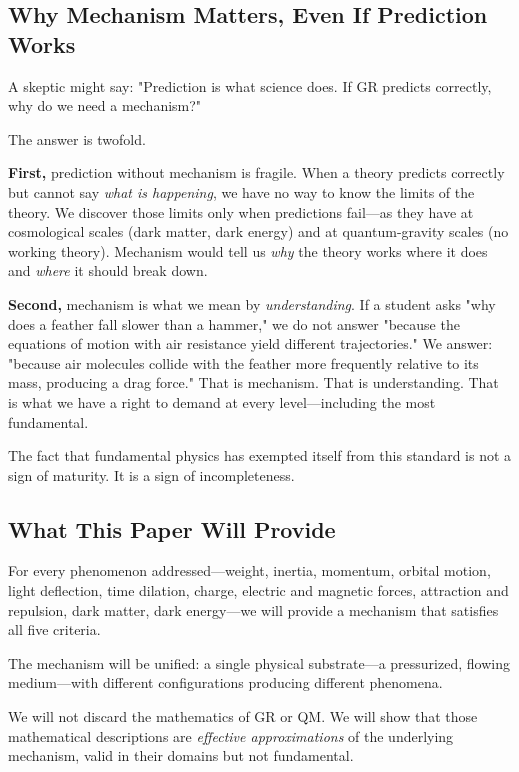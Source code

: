 \documentclass[12pt, a4paper]{article}
\begin{document}
\subsection{Why Mechanism Matters, Even If Prediction Works}
\label{subsec:why_mechanism_matters}

A skeptic might say: "Prediction is what science does. If GR predicts correctly, why do we need a mechanism?"

The answer is twofold.

\textbf{First,} prediction without mechanism is fragile. When a theory predicts correctly but cannot say \textit{what is happening}, we have no way to know the limits of the theory. We discover those limits only when predictions fail—as they have at cosmological scales (dark matter, dark energy) and at quantum-gravity scales (no working theory). Mechanism would tell us \textit{why} the theory works where it does and \textit{where} it should break down.

\textbf{Second,} mechanism is what we mean by \textit{understanding}. If a student asks "why does a feather fall slower than a hammer," we do not answer "because the equations of motion with air resistance yield different trajectories." We answer: "because air molecules collide with the feather more frequently relative to its mass, producing a drag force." That is mechanism. That is understanding. That is what we have a right to demand at every level—including the most fundamental.

The fact that fundamental physics has exempted itself from this standard is not a sign of maturity. It is a sign of incompleteness.

\subsection{What This Paper Will Provide}
\label{subsec:what_paper_provides}

For every phenomenon addressed—weight, inertia, momentum, orbital motion, light deflection, time dilation, charge, electric and magnetic forces, attraction and repulsion, dark matter, dark energy—we will provide a mechanism that satisfies all five criteria.

The mechanism will be unified: a single physical substrate—a pressurized, flowing medium—with different configurations producing different phenomena.

We will not discard the mathematics of GR or QM. We will show that those mathematical descriptions are \textit{effective approximations} of the underlying mechanism, valid in their domains but not fundamental.
\end{document}
